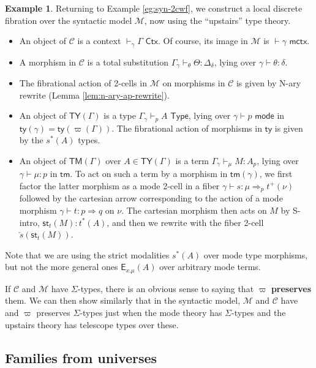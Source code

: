\documentclass[10pt]{article}
\theoremstyle{definition}
\newtheorem{example}{Example}
\newcommand{\yields}{\vdash}
\newcommand{\tcell}{\Rightarrow}
\newcommand{\CTX}{\,\,\mathsf{Ctx}}
\newcommand{\ctx}{\,\,\mathsf{mctx}}
\newcommand{\TYPE}{\,\,\mathsf{Type}}
\newcommand{\type}{\,\,\mathsf{mode}}
\newcommand{\rewrite}[2]{\overleftarrow{#1}(#2)}
\newcommand\E[2]{\ensuremath{\mathsf{E}_{#1}(#2)}}
\newcommand\St[2]{\ensuremath{{#1}^*(#2)}}
\newcommand\StI[2]{\ensuremath{\mathsf{st}_{#1}(#2)}}
\newcommand\TypeTwo[4]{\ensuremath{#1 \vdash #2 :  #3 \tcell #4}}
\newcommand\TermTwoT[5]{\ensuremath{#1 \vdash {#2} : #3 \tcell_{#5} #4}}
\newcommand\TrPlus[2]{\ensuremath{{#1}^+(#2)}}
\newcommand\M{\mathcal{M}}
\newcommand\Mty{\mathsf{ty}}
\newcommand\Mtm{\mathsf{tm}}
\newcommand\C{\mathcal{C}}
\newcommand\Cty{\mathsf{TY}}
\newcommand\Ctm{\mathsf{TM}}
\newcommand\vp{\varpi}
\begin{document}
\begin{example}\label{eg:syn-fib-2cwf}
  Returning to Example \ref{eg:syn-2cwf}, we construct a local discrete fibration over the syntactic model $\M$, now using the ``upstairs'' type theory.
  \begin{itemize}
  \item An object of $\C$ is a context $\yields_\gamma \Gamma \CTX$.
    Of course, its image in $\M$ is $\yields \gamma \ctx$.
  \item A morphism in $\C$ is a total substitution $\Gamma_{\gamma} \yields_\theta \Theta : \Delta_\delta$, lying over $\gamma \yields \theta : \delta$.
  \item The fibrational action of 2-cells in $\M$ on morphisms in $\C$ is given by N-ary rewrite (Lemma \ref{lem:n-ary-ap-rewrite}).
  \item An object of $\Cty(\Gamma)$ is a type $\Gamma_\gamma \yields_p A \TYPE$, lying over $\gamma \yields p\type$ in $\Mty(\gamma) = \Mty(\vp(\Gamma))$.
    The fibrational action of morphisms in $\Mty$ is given by the $\St{s}{A}$ types.
  \item An object of $\Ctm(\Gamma)$ over $A\in \Cty(\Gamma)$ is a term $\Gamma_\gamma \yields_\mu M:A_p$, lying over $\gamma \yields \mu:p$ in $\Mtm$.
    To act on such a term by a morphism in $\Mtm(\gamma)$, we first factor the latter morphism as a mode 2-cell in a fiber $\TermTwoT{\gamma}{s}{\mu}{\TrPlus{t}{\nu}}{p}$ followed by the cartesian arrow corresponding to the action of a mode morphism $\TypeTwo{\gamma}{t}{p}{q}$ on $\nu$.
    The cartesian morphism then acts on $M$ by S-intro, $\StI{t}{M} : \St{t}{A}$, and then we rewrite with the fiber 2-cell $\rewrite{s}{\StI{t}{M}}$.
  \end{itemize}
\end{example}

Note that we are using the strict modalities $\St{s}{A}$ over mode type morphisms, but not the more general ones $\E{x.\mu}{A}$ over arbitrary mode terms.

If $\C$ and $\M$ have $\Sigma$-types, there is an obvious sense to saying that $\vp$ \textbf{preserves} them.
We can then show similarly that in the syntactic model, $\M$ and $\C$ have and $\vp$ preserves $\Sigma$-types just when the mode theory has $\Sigma$-types and the upstairs theory has telescope types over these.


\subsection{Families from universes}
\label{sec:2cwf-univ}
\end{document}
